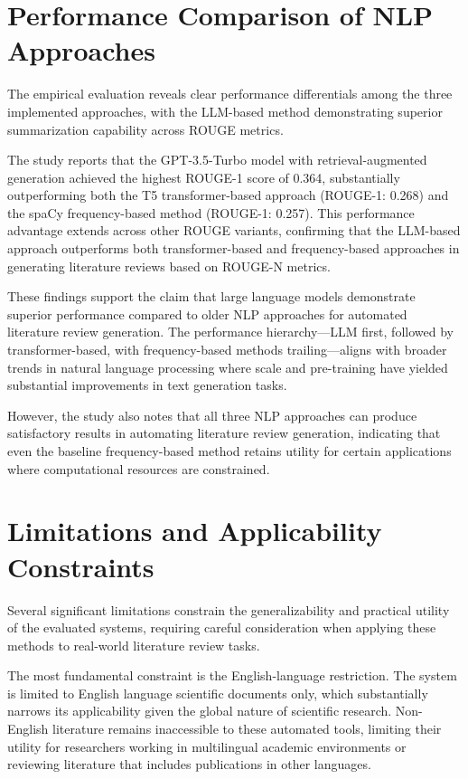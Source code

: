 \documentclass{article}
\begin{document}
\section{Performance Comparison of NLP Approaches}
The empirical evaluation reveals clear performance differentials among the three implemented approaches, with the LLM-based method demonstrating superior summarization capability across ROUGE metrics.

The study reports that the GPT-3.5-Turbo model with retrieval-augmented generation achieved the highest ROUGE-1 score of 0.364, substantially outperforming both the T5 transformer-based approach (ROUGE-1: 0.268) and the spaCy frequency-based method (ROUGE-1: 0.257). This performance advantage extends across other ROUGE variants, confirming that the LLM-based approach outperforms both transformer-based and frequency-based approaches in generating literature reviews based on ROUGE-N metrics.

These findings support the claim that large language models demonstrate superior performance compared to older NLP approaches for automated literature review generation. The performance hierarchy—LLM first, followed by transformer-based, with frequency-based methods trailing—aligns with broader trends in natural language processing where scale and pre-training have yielded substantial improvements in text generation tasks.

However, the study also notes that all three NLP approaches can produce satisfactory results in automating literature review generation, indicating that even the baseline frequency-based method retains utility for certain applications where computational resources are constrained.

\section{Limitations and Applicability Constraints}
Several significant limitations constrain the generalizability and practical utility of the evaluated systems, requiring careful consideration when applying these methods to real-world literature review tasks.

The most fundamental constraint is the English-language restriction. The system is limited to English language scientific documents only, which substantially narrows its applicability given the global nature of scientific research. Non-English literature remains inaccessible to these automated tools, limiting their utility for researchers working in multilingual academic environments or reviewing literature that includes publications in other languages.
\end{document}
